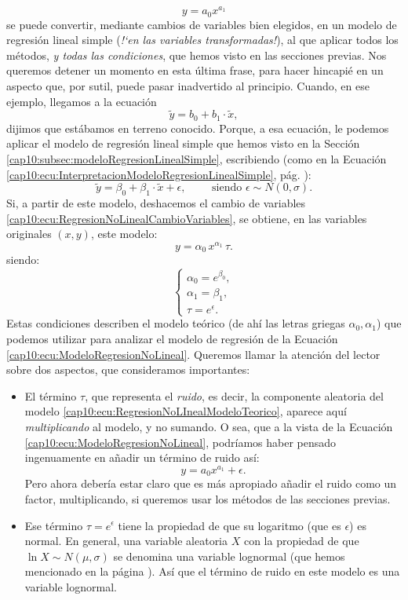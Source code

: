 \[
y=a_0 x^{a_1}
\]
se puede convertir, mediante cambios de variables bien elegidos, en un modelo de regresión lineal simple ({\em {!`}en las variables transformadas!}), al que aplicar todos los métodos, {\em y todas las condiciones}, que hemos visto en las secciones previas. Nos queremos detener un momento en esta última frase, para hacer hincapié en un aspecto que, por sutil, puede pasar inadvertido al principio.
Cuando, en ese ejemplo, llegamos a la ecuación
\[\tilde y=b_0+b_1\cdot\tilde x,\]
dijimos que estábamos en terreno conocido. Porque, a esa ecuación, le podemos aplicar el modelo de regresión lineal simple que hemos visto en la Sección \ref{cap10:subsec:modeloRegresionLinealSimple}, escribiendo (como en la Ecuación \ref{cap10:ecu:InterpretacionModeloRegresionLinealSimple}, pág. \pageref{cap10:ecu:InterpretacionModeloRegresionLinealSimple}):
    \begin{equation}\label{cap10:ecu:RegresionNoLinealModeloRegresionLinealSimpleFuncionTransformada}
        \tilde y=
        \beta_0 +\beta_1\cdot \tilde x +\epsilon,
        \qquad\mbox{ siendo }\epsilon\sim N(0,\sigma).
    \end{equation}
Si, a partir de este modelo, deshacemos el cambio de variables \ref{cap10:ecu:RegresionNoLinealCambioVariables}, se obtiene, en las variables originales $(x,y)$, este modelo:
\begin{equation}
\label{cap10:ecu:RegresionNoLInealModeloTeorico}
y=\alpha_0\, x^{\alpha_1}\,\tau.
\end{equation}
siendo:
\[
\begin{cases}
\alpha_0=e^{\beta_0},\\
\alpha_1=\beta_1,\\
\tau=e^{\epsilon}.
\end{cases}
\]
Estas condiciones describen el modelo teórico (de ahí las letras griegas $\alpha_0, \alpha_1$) que podemos utilizar para analizar el modelo de regresión de la Ecuación \ref{cap10:ecu:ModeloRegresionNoLineal}. Queremos llamar la atención del lector sobre dos aspectos, que consideramos importantes:
\begin{itemize}
  \item El término $\tau$, que representa el {\em ruido}, es decir, la componente aleatoria del modelo \ref{cap10:ecu:RegresionNoLInealModeloTeorico}, aparece aquí {\em multiplicando} al modelo, y no sumando. O sea, que a la vista de la Ecuación \ref{cap10:ecu:ModeloRegresionNoLineal}, podríamos haber pensado ingenuamente en añadir un término de ruido así:
        \[
        y=a_0 x^{a_1}+\epsilon.
        \]
        Pero ahora debería estar claro que es más apropiado añadir el ruido como un factor, multiplicando, si queremos usar los métodos de las secciones previas.
  \item Ese término $\tau=e^{\epsilon}$ tiene la propiedad de que su logaritmo (que es $\epsilon$) es normal. En general, una variable aleatoria $X$ con la propiedad de que $\ln X\sim N(\mu,\sigma)$ se denomina una variable {\sf lognormal} (que hemos mencionado en la página \pageref{cap09:subsubsec:VariableLogNormal}). Así que el término de ruido en este modelo es una variable lognormal.
\end{itemize}

